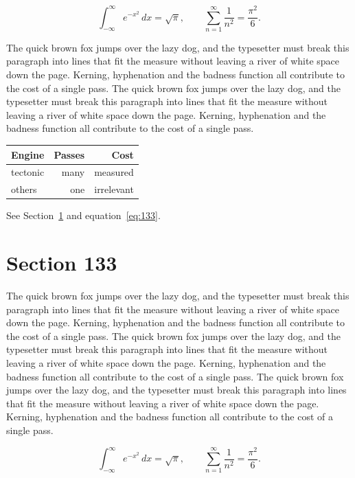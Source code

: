 \documentclass{article}
\begin{document}
\begin{equation}\label{eq:132}
\int_{-\infty}^{\infty} e^{-x^{2}}\,dx = \sqrt{\pi}, \qquad
\sum_{n=1}^{\infty} \frac{1}{n^{2}} = \frac{\pi^{2}}{6}.
\end{equation}

The quick brown fox jumps over the lazy dog, and the typesetter must break this paragraph into lines that fit the measure without leaving a river of white space down the page. Kerning, hyphenation and the badness function all contribute to the cost of a single pass. The quick brown fox jumps over the lazy dog, and the typesetter must break this paragraph into lines that fit the measure without leaving a river of white space down the page. Kerning, hyphenation and the badness function all contribute to the cost of a single pass. 

\begin{center}
\begin{tabular}{lrr}
\toprule
Engine & Passes & Cost \\
\midrule
tectonic & many & measured \\
others & one & irrelevant \\
\bottomrule
\end{tabular}
\end{center}

See Section~\ref{sec:133} and equation~\eqref{eq:133}.
\section{Section 133}
\label{sec:133}
The quick brown fox jumps over the lazy dog, and the typesetter must break this paragraph into lines that fit the measure without leaving a river of white space down the page. Kerning, hyphenation and the badness function all contribute to the cost of a single pass. The quick brown fox jumps over the lazy dog, and the typesetter must break this paragraph into lines that fit the measure without leaving a river of white space down the page. Kerning, hyphenation and the badness function all contribute to the cost of a single pass. The quick brown fox jumps over the lazy dog, and the typesetter must break this paragraph into lines that fit the measure without leaving a river of white space down the page. Kerning, hyphenation and the badness function all contribute to the cost of a single pass. 

\begin{equation}\label{eq:133}
\int_{-\infty}^{\infty} e^{-x^{2}}\,dx = \sqrt{\pi}, \qquad
\sum_{n=1}^{\infty} \frac{1}{n^{2}} = \frac{\pi^{2}}{6}.
\end{equation}
\end{document}
